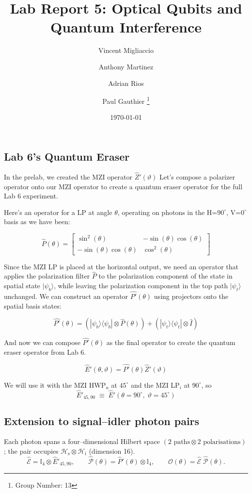 \documentclass{article}
\title{Lab Report 5: Optical Qubits and Quantum Interference}
\author{
  Vincent Migliaccio \and
  Anthony Martinez \and
  Adrian Rios \and
  Paul Gauthier
  \thanks{Group Number: 13} \\
}
\date{\today}
\begin{document}


\subsection*{Lab 6's Quantum Eraser}

In the prelab, we created the MZI operator $\hat{Z}'(\vartheta)$
Let's compose a polarizer operator onto our MZI operator
to create a quantum eraser operator for the full Lab 6 experiment.

Here's an operator for a LP at angle $\theta$,
operating on photons in the H=$90^\circ$, V=$0^\circ$ basis as we have been:

$$\hat{P}(\theta) = \left[\begin{matrix}\sin^{2}{\left(\theta \right)} & - \sin{\left(\theta \right)} \cos{\left(\theta \right)}\\- \sin{\left(\theta \right)} \cos{\left(\theta \right)} & \cos^{2}{\left(\theta \right)}\end{matrix}\right]$$


Since the MZI LP is placed at the horizontal output, 
we need an operator that applies the polarization filter $\hat{P}$
to the polarization component of the state in spatial state $|\psi_b\rangle$,
while leaving the polarization component in the top path $|\psi_t\rangle$ unchanged.
We can construct an operator $\hat{P'}(\theta)$
using projectors onto the spatial basis states:

$$  \hat{P'}(\theta) = (|\psi_b\rangle\langle\psi_b| \otimes \hat{P}(\theta)) + (|\psi_t\rangle\langle\psi_t| \otimes \hat{I}) $$

And now we can compose $\hat{P'}(\theta)$ as the final operator to create
the quantum eraser operator from Lab 6.

$$\hat{E}'(\theta,\vartheta) = \hat{P'}(\theta) \hat{Z}'(\vartheta)$$

We will use it with the MZI HWP$_u$ at $45^\circ$ and the
MZI LP$_i$ at $90^\circ$, so
$$
\hat{E}'_{45,90}\;\equiv\;
\hat{E}'\!\left(\theta=90^\circ,\;\vartheta=45^\circ\right)
$$

\subsection*{Extension to signal–idler photon pairs}

Each photon spans a four–dimensional Hilbert space
\((2\text{ paths}\otimes 2\text{ polarisations})\);               
the pair occupies
\(\mathcal{H}_{\mathrm{s}}\otimes\mathcal{H}_{\mathrm{i}}\) (dimension 16).
\[
\hat{\mathcal{E}}=
\mathbb{I}_{4}\otimes\hat{E}'_{45,90},\qquad
\hat{\mathcal{P}}(\theta)=\hat{P}'(\theta)\otimes\mathbb{I}_{4},\qquad
\hat{\mathcal{O}}(\theta)=\hat{\mathcal{E}}\;\hat{\mathcal{P}}(\theta).
\]
\end{document}
